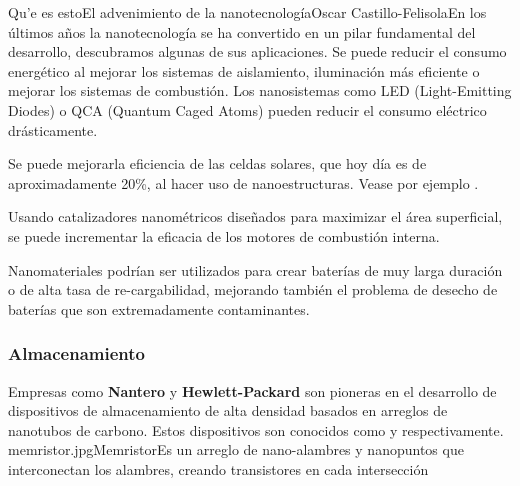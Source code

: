 \begin{Artikel}{Qu'e es esto}{El advenimiento de la nanotecnolog\'ia}{Oscar Castillo-Felisola}{En los \'ultimos a\~nos la nanotecnolog\'ia se ha convertido en un pilar fundamental del desarrollo, descubramos algunas de sus aplicaciones.}
Se puede reducir el consumo energ\'etico al mejorar los sistemas de aislamiento, iluminaci\'on m\'as eficiente o mejorar los sistemas de combusti\'on. Los nanosistemas como LED (Light-Emitting Diodes) o QCA (Quantum Caged Atoms) pueden reducir el consumo el\'ectrico dr\'asticamente.

Se puede mejorarla eficiencia de las celdas solares, que hoy d\'ia es de aproximadamente 20\%, al hacer uso de nanoestructuras. Vease por ejemplo .

Usando catalizadores nanom\'etricos dise\~nados para maximizar el \'area superficial, se puede incrementar la eficacia de los motores de combusti\'on interna.

Nanomateriales podr\'ian ser utilizados para crear bater\'ias de  muy larga duraci\'on o de alta tasa de re-cargabilidad, mejorando tambi\'en el problema de desecho de bater\'ias que son extremadamente contaminantes.



\subsubsection*{Almacenamiento}
Empresas como {\bf Nantero} y {\bf Hewlett-Packard} son pioneras en el desarrollo de dispositivos de almacenamiento de alta densidad basados en arreglos de nanotubos de carbono. Estos dispositivos son conocidos como  y  respectivamente.
\Bild%
    {memristor.jpg}{Memristor}{Es un arreglo de nano-alambres y nanopuntos que interconectan los alambres, creando transistores en cada intersecci\'on}


\end{Artikel}
